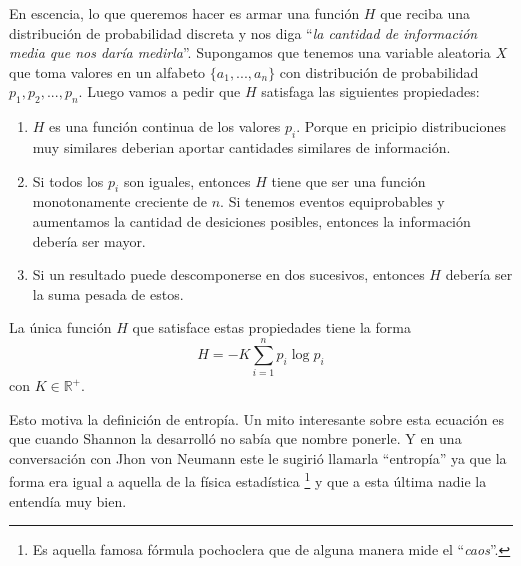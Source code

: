 En escencia, lo que queremos hacer es armar una función $H$ que reciba una distribución de probabilidad discreta y nos diga ``{\it la cantidad de informaci\'on media que nos dar\'ia medirla}''. Supongamos que tenemos una variable aleatoria $X$ que toma valores en un alfabeto $\{a_1,...,a_n\}$ con distribución de probabilidad $p_1,p_2,...,p_n$. Luego vamos a pedir que $H$ satisfaga las siguientes propiedades:
\begin{enumerate}
    \item $H$ es una funci\'on continua de los valores $p_i$. Porque en pricipio distribuciones muy similares deberian aportar cantidades similares de informaci\'on.
    \item Si todos los $p_i$ son iguales, entonces $H$ tiene que ser una funci\'on monotonamente creciente de $n$. Si tenemos eventos equiprobables y aumentamos la cantidad de desiciones posibles, entonces la informaci\'on deber\'ia ser mayor.
    \item Si un resultado puede descomponerse en dos sucesivos, entonces $H$ deber\'ia ser la suma pesada de estos. 
\end{enumerate}

\begin{theorem}
    La \'unica funci\'on $H$ que satisface estas propiedades tiene la forma
    \begin{equation}
        H = -K \sum^n_{i=1}p_i \log p_i
    \end{equation}
    con $K\in\mathbb{R}^+$.
\end{theorem}
Esto motiva la definici\'on de entrop\'ia. Un mito interesante sobre esta ecuaci\'on es que cuando Shannon la desarroll\'o no sab\'ia que nombre ponerle. Y en una conversaci\'on con Jhon von Neumann este le sugiri\'o llamarla ``entrop\'ia'' ya que la forma era igual a aquella de la f\'isica estad\'istica \footnote{Es aquella famosa f\'ormula pochoclera que de alguna manera mide el ``{\it caos}''.} y que a esta \'ultima nadie la entend\'ia muy bien.

